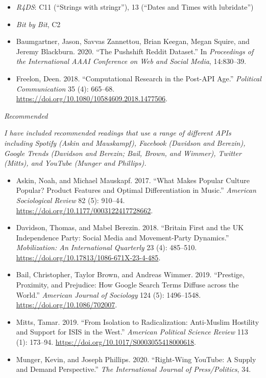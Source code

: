 \documentclass[
  10pt,
]{article}
\providecommand{\tightlist}{%
  \setlength{\itemsep}{0pt}\setlength{\parskip}{0pt}}
\begin{document}
\begin{itemize}
\tightlist
\item
  \emph{R4DS}: C11 (``Strings with stringr''), 13 (``Dates and Times
  with lubridate'')
\item
  \emph{Bit by Bit}, C2
\item
  Baumgartner, Jason, Savvas Zannettou, Brian Keegan, Megan Squire, and
  Jeremy Blackburn. 2020. ``The Pushshift Reddit Dataset.'' In
  \emph{Proceedings of the International AAAI Conference on Web and
  Social Media}, 14:830--39.
\item
  Freelon, Deen. 2018. ``Computational Research in the Post-API Age.''
  \emph{Political Communication} 35 (4): 665--68.
  \url{https://doi.org/10.1080/10584609.2018.1477506}.
\end{itemize}

\emph{Recommended}

\emph{I have included recommended readings that use a range of different
APIs including Spotify (Askin and Mauskampf), Facebook (Davidson and
Berezin), Google Trends (Davidson and Berezin; Bail, Brown, and Wimmer),
Twitter (Mitts), and YouTube (Munger and Phillips).}

\begin{itemize}
\tightlist
\item
  Askin, Noah, and Michael Mauskapf. 2017. ``What Makes Popular Culture
  Popular? Product Features and Optimal Differentiation in Music.''
  \emph{American Sociological Review} 82 (5): 910--44.
  \url{https://doi.org/10.1177/0003122417728662}.
\item
  Davidson, Thomas, and Mabel Berezin. 2018. ``Britain First and the UK
  Independence Party: Social Media and Movement-Party Dynamics.''
  \emph{Mobilization: An International Quarterly} 23 (4): 485--510.
  \url{https://doi.org/10.17813/1086-671X-23-4-485}.
\item
  Bail, Christopher, Taylor Brown, and Andreas Wimmer. 2019. ``Prestige,
  Proximity, and Prejudice: How Google Search Terms Diffuse across the
  World.'' \emph{American Journal of Sociology} 124 (5): 1496--1548.
  \url{https://doi.org/10.1086/702007}.
\item
  Mitts, Tamar. 2019. ``From Isolation to Radicalization: Anti-Muslim
  Hostility and Support for ISIS in the West.'' \emph{American Political
  Science Review} 113 (1): 173--94.
  \url{https://doi.org/10.1017/S0003055418000618}.
\item
  Munger, Kevin, and Joseph Phillips. 2020. ``Right-Wing YouTube: A
  Supply and Demand Perspective.'' \emph{The International Journal of
  Press/Politics}, 34.
\end{itemize}
\end{document}

